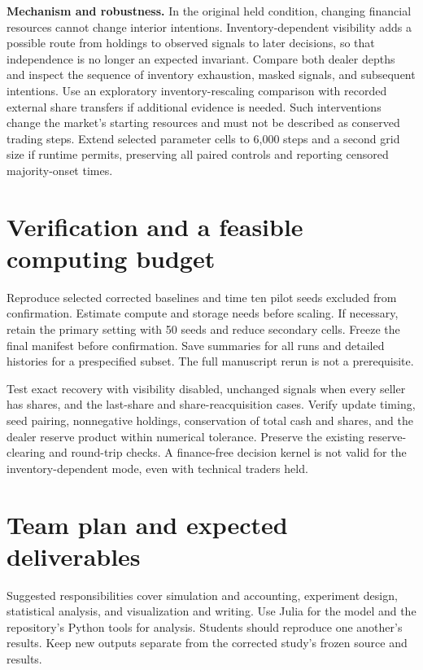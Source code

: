 \documentclass[11pt,letterpaper]{article}
\newcommand{\lead}[1]{\textbf{\textcolor{ink}{#1}}}
\begin{document}
\lead{Mechanism and robustness.} In the original held condition, changing financial resources cannot change interior intentions. Inventory-dependent visibility adds a possible route from holdings to observed signals to later decisions, so that independence is no longer an expected invariant. Compare both dealer depths and inspect the sequence of inventory exhaustion, masked signals, and subsequent intentions. Use an exploratory inventory-rescaling comparison with recorded external share transfers if additional evidence is needed. Such interventions change the market's starting resources and must not be described as conserved trading steps. Extend selected parameter cells to 6,000 steps and a second grid size if runtime permits, preserving all paired controls and reporting censored majority-onset times.

\section{Verification and a feasible computing budget}
Reproduce selected corrected baselines and time ten pilot seeds excluded from confirmation. Estimate compute and storage needs before scaling. If necessary, retain the primary setting with 50 seeds and reduce secondary cells. Freeze the final manifest before confirmation. Save summaries for all runs and detailed histories for a prespecified subset. The full manuscript rerun is not a prerequisite.

Test exact recovery with visibility disabled, unchanged signals when every seller has shares, and the last-share and share-reacquisition cases. Verify update timing, seed pairing, nonnegative holdings, conservation of total cash and shares, and the dealer reserve product within numerical tolerance. Preserve the existing reserve-clearing and round-trip checks. A finance-free decision kernel is not valid for the inventory-dependent mode, even with technical traders held.

\newpage
\section{Team plan and expected deliverables}
Suggested responsibilities cover simulation and accounting, experiment design, statistical analysis, and visualization and writing. Use Julia for the model and the repository's Python tools for analysis. Students should reproduce one another's results. Keep new outputs separate from the corrected study's frozen source and results.
\end{document}
